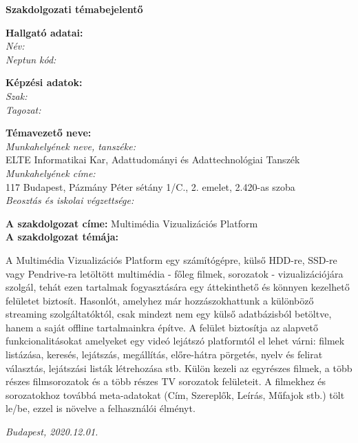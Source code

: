 
\thispagestyle{empty}
{\bf \huge {Szakdolgozati témabejelentő}}

\begin{flushleft}
    {\bf {Hallgató adatai:}}\\
    \> \> \> \> {\emph {Név: }} \authorname\\
    \> \> \> \> {\emph {Neptun kód: }} \neptuncode\\
    \vspace{0.3cm}

    {\bf {Képzési adatok:}}\\
    \> \> \> \> {\emph {Szak: }} \degreename\\
    \> \> \> \> {\emph {Tagozat: }} \studytype\\
    \vspace{0.3cm}
    
    {\bf {Témavezető neve:}} \supname\\
    \> \> \> \> {\emph {Munkahelyének neve, tanszéke: }}\\
    \> \> \> \> \> \> \> \> {\small {ELTE Informatikai Kar, Adattudományi és Adattechnológiai Tanszék}}\\
    \> \> \> \> {\emph {Munkahelyének címe: }}\\
    \> \> \> \> \> \> \> \> {\small {117 Budapest, Pázmány Péter sétány 1/C., 2. emelet, 2.420-as szoba}}\\
    \> \> \> \> {\emph {Beosztás és iskolai végzettsége: }} {\small \supaff}\\
\end{flushleft}

\vspace{0.5cm}

{\bf {A szakdolgozat címe:}} {Multimédia Vizualizációs Platform}\\
\vspace{1cm}
\> \> {\bf {A szakdolgozat témája:}}
\par
{A Multimédia Vizualizációs Platform egy számítógépre, külső HDD-re, SSD-re vagy Pendrive-ra letöltött multimédia - főleg filmek, sorozatok - vizualizációjára szolgál, tehát ezen tartalmak fogyasztására egy áttekinthető és könnyen kezelhető felületet biztosít. Hasonlót, amelyhez már hozzászokhattunk a különböző streaming szolgáltatóktól, csak mindezt nem egy külső adatbázisból betöltve, hanem a saját offline tartalmainkra építve. A felület biztosítja az alapvető funkcionalitásokat amelyeket egy videó lejátszó platformtól el lehet várni: filmek listázása, keresés, lejátszás, megállítás, előre-hátra pörgetés, nyelv és felirat választás, lejátszási listák létrehozása stb. Külön kezeli az egyrészes filmek, a több részes filmsorozatok és a több részes TV sorozatok felületeit. A filmekhez és sorozatokhoz továbbá meta-adatokat (Cím, Szereplők, Leírás, Műfajok stb.) tölt le/be, ezzel is növelve a felhasználói élményt.}

\vspace*{\fill}

{\it {Budapest}, {2020.12.01.}}

\vspace*{\fill}
